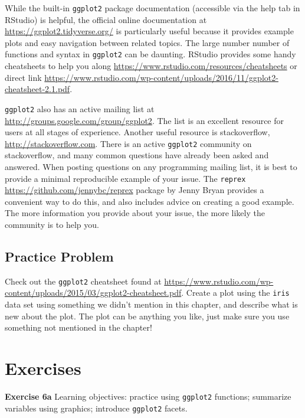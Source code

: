 \documentclass[
]{krantz}
\begin{document}
While the built-in \texttt{ggplot2} package documentation (accessible via the help tab in RStudio) is helpful, the official online documentation at \url{https://ggplot2.tidyverse.org/} is particularly useful because it provides example plots and easy navigation between related topics. The large number number of functions and syntax in \texttt{ggplot2} can be daunting. RStudio provides some handy cheatsheets to help you along \url{https://www.rstudio.com/resources/cheatsheets} or direct link \url{https://www.rstudio.com/wp-content/uploads/2016/11/ggplot2-cheatsheet-2.1.pdf}.

\texttt{ggplot2} also has an active mailing list at \url{http://groups.google.com/group/ggplot2}. The list is an excellent resource for users at all stages of experience. Another useful resource is stackoverflow, \url{http://stackoverflow.com}. There is an active \texttt{ggplot2} community on stackoverflow, and many common questions have already been asked and answered. When posting questions on any programming mailing list, it is best to provide a minimal reproducible example of your issue. The \texttt{reprex} \url{https://github.com/jennybc/reprex} package by Jenny Bryan provides a convenient way to do this, and also includes advice on creating a good example. The more information you provide about your issue, the more likely the community is to help you.

\hypertarget{practice-problem-5}{%
\subsection{Practice Problem}\label{practice-problem-5}}

Check out the \texttt{ggplot2} cheatsheet found at \url{https://www.rstudio.com/wp-content/uploads/2015/03/ggplot2-cheatsheet.pdf}. Create a plot using the \texttt{iris} data set using something we didn't mention in this chapter, and describe what is new about the plot. The plot can be anything you like, just make sure you use something not mentioned in the chapter!

\hypertarget{exercises-2}{%
\section{Exercises}\label{exercises-2}}

\textbf{Exercise 6a} Learning objectives: practice using \texttt{ggplot2} functions; summarize variables using graphics; introduce \texttt{ggplot2} facets.
\end{document}
